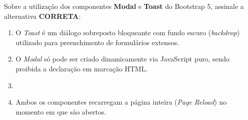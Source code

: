 \newpage

\begin{tcolorbox}[colback=white, colframe=azulTitulo, title=\textbf{Questão 8: Componentes de Feedback no Bootstrap 5}]
    Sobre a utilização dos componentes \textbf{Modal} e \textbf{Toast} do Bootstrap 5, assinale a alternativa \textbf{CORRETA}:
    \begin{enumerate}[label=\alph*)]
        \item O \textit{Toast} é um diálogo sobreposto bloqueante com fundo escuro (\textit{backdrop}) utilizado para preenchimento de formulários extensos.
        \item O \textit{Modal} só pode ser criado dinamicamente via JavaScript puro, sendo proibida a declaração em marcação HTML.
        \item {}
        \item Ambos os componentes recarregam a página inteira (\textit{Page Reload}) no momento em que são abertos.
    \end{enumerate}
\end{tcolorbox}

